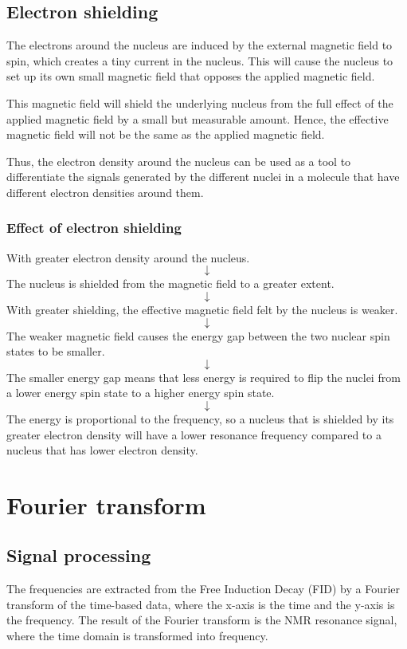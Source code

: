 \documentclass[11pt]{article}
\begin{document}
\newpage

\subsection{Electron shielding}
\label{sec:org02ed426}

The electrons around the nucleus are induced by the external magnetic field to spin, which creates a tiny current in the nucleus. This will cause the nucleus to set up its own small magnetic field that opposes the applied magnetic field.

This magnetic field will shield the underlying nucleus from the full effect of the applied magnetic field by a small but measurable amount. Hence, the effective magnetic field will not be the same as the applied magnetic field.

Thus, the electron density around the nucleus can be used as a tool to differentiate the signals generated by the different nuclei in a molecule that have different electron densities around them.

\subsubsection{Effect of electron shielding}
\label{sec:org988618d}
With greater electron density around the nucleus.
\[\downarrow\]
The nucleus is shielded from the magnetic field to a greater extent.
\[\downarrow\]
With greater shielding, the effective magnetic field felt by the nucleus is weaker.
\[\downarrow\]
The weaker magnetic field causes the energy gap between the two nuclear spin states to be smaller.
\[\downarrow\]
The smaller energy gap means that less energy is required to flip the nuclei from a lower energy spin state to a higher energy spin state.
\[\downarrow\]
The energy is proportional to the frequency, so a nucleus that is shielded by its greater electron density will have a lower resonance frequency compared to a nucleus that has lower electron density.

\newpage

\section{Fourier transform}
\label{sec:orgd8fcb38}

\subsection{Signal processing}
\label{sec:org79592d3}
The frequencies are extracted from the Free Induction Decay (FID) by a Fourier transform of the time-based data, where the x-axis is the time and the y-axis is the frequency. The result of the Fourier transform is the NMR resonance signal, where the time domain is transformed into frequency.
\end{document}
